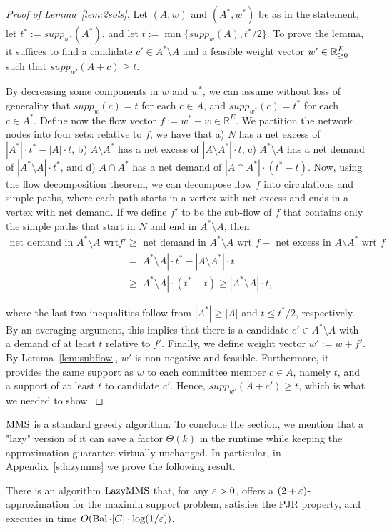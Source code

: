 \begin{proof}[Proof of Lemma~\ref{lem:2sols}]
Let $(A,w)$ and $(A^*, w^*)$ be as in the statement, let $t^*:=supp_{w^*}(A^*)$, and let $t:=\min\{supp_w(A), t^*/2\}$. To prove the lemma, it suffices to find a candidate $c'\in A^*\setminus A$ and a feasible weight vector $w'\in\mathbb{R}_{\geq 0}^E$ such that $supp_{w'}(A+c)\geq t$.

By decreasing some components in $w$ and $w^*$, we can assume without loss of generality that $supp_w(c)=t$ for each $c\in A$, and $supp_{w^*}(c)=t^*$ for each $c\in A^*$. Define now the flow vector $f:=w^* - w\in\mathbb{R}^E$. 
We partition the network nodes into four sets: relative to $f$, we have that a) $N$ has a net excess of $|A^*|\cdot t^* - |A|\cdot t$, b) $A\setminus A^*$ has a net excess of $|A\setminus A^*|\cdot t$, c) $A^*\setminus A$ has a net demand of $|A^*\setminus A|\cdot t^*$, and d) $A\cap A^*$ has a net demand of $|A\cap A^*|\cdot (t^*-t)$.
Now, using the flow decomposition theorem, we can decompose flow $f$ into circulations and simple paths, where each path starts in a vertex with net excess and ends in a vertex with net demand. If we define $f'$ to be the sub-flow of $f$ that contains only the simple paths that start in $N$ and end in $A^*\setminus A$, then %
%
\begin{align*}
    \text{net demand in $A^*\setminus A$ wrt } f' &\geq \text{ net demand in $A^*\setminus A$ wrt } f - \text{ net excess in $A\setminus A^*$ wrt } f\\
    &= |A^*\setminus A|\cdot t^* - |A\setminus A^*|\cdot t\\
    &\geq |A^*\setminus A|\cdot (t^*-t) \geq |A^*\setminus A|\cdot t,
\end{align*}

where the last two inequalities follow from $|A^*|\geq |A|$ and $t\leq t^*/2$, respectively. By an averaging argument, this implies that there is a candidate $c'\in A^*\setminus A$ with a demand of at least $t$ relative to $f'$.
Finally, we define weight vector $w':=w+f'$. By Lemma~\ref{lem:subflow}, $w'$ is non-negative and feasible. 
Furthermore, it provides the same support as $w$ to each committee member $c\in A$, namely $t$, and a support of at least $t$ to candidate $c'$. Hence, $supp_{w'}(A+c')\geq t$, which is what we needed to show.
\end{proof}

$\operatorname{MMS}$ is a standard greedy algorithm. 
To conclude the section, we mention that a "lazy" version of it can save a factor $\Theta(k)$ in the runtime while keeping the approximation guarantee virtually unchanged. 
In particular, in Appendix~\ref{s:lazymms} we prove the following result.

\begin{theorem}\label{thm:2eps}
There is an algorithm $\operatorname{LazyMMS}$ that, for any $\varepsilon>0$, offers a $(2+\varepsilon)$-approximation for the maximin support problem, satisfies the PJR property, and executes in time $O(\operatorname{Bal}\cdot |C|\cdot \log(1/\varepsilon))$.
\end{theorem}

